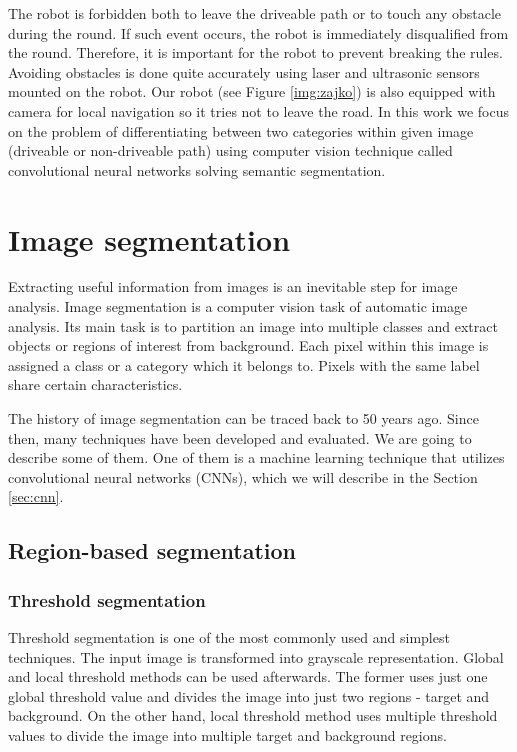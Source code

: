 The robot is forbidden both to leave the driveable path or to touch any obstacle during
the round. If such event occurs, the robot is immediately disqualified from the round.
Therefore, it is important for the robot to prevent breaking the rules. Avoiding
obstacles is done quite accurately using laser and ultrasonic sensors mounted on the
robot. Our robot (see Figure \ref{img:zajko})
is also equipped with camera for local navigation so it tries not to leave the road.
In this work we focus on the problem of differentiating between two categories within
given image (driveable or non-driveable path) using computer vision technique called
convolutional neural networks solving semantic segmentation.

\section{Image segmentation}
\label{sec:image_segmentation}

Extracting useful information from images is an inevitable step for image analysis.
Image segmentation is a computer vision task of automatic image analysis.
Its main task is to partition an image into multiple
classes and extract objects or regions of interest from background.
Each pixel within this image is assigned a class or a category which
it belongs to. Pixels with the same label share certain characteristics.
\cite{bib:zhang2009image}

The history of image segmentation can be traced back to 50 years ago.
Since then, many techniques have been developed and evaluated.
We are going to describe some of them.
One of them is a machine learning technique that utilizes convolutional neural networks
(CNNs), which we will describe in the Section \ref{sec:cnn}.

\subsection{Region-based segmentation}
\label{sec:image_segmentation:region_based}

\subsubsection{Threshold segmentation}
\label{sec:image_segmentation:region_based:threshold}

Threshold segmentation is one of the most commonly used and simplest techniques.
The input image is transformed into grayscale representation. Global and local threshold
methods can be used afterwards. The former uses just one global threshold
value and divides the image into just two regions - target and background. On the other
hand, local threshold method uses multiple threshold values to divide the image
into multiple target and background regions.

